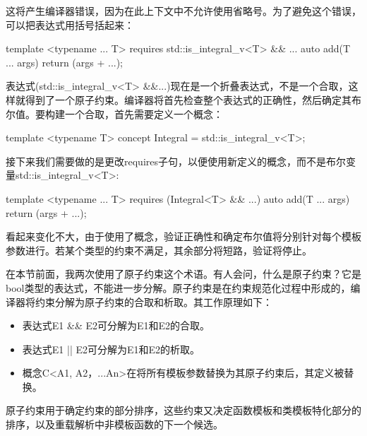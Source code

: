 这将产生编译器错误，因为在此上下文中不允许使用省略号。为了避免这个错误，可以把表达式用括号括起来：

\begin{cpp}
	template <typename ... T>
	requires std::is_integral_v<T> && ...
	auto add(T ... args)
	{
		return (args + ...);
	}
\end{cpp}

表达式(std::is\_integral\_v<T> \&\&...)现在是一个折叠表达式，不是一个合取，这样就得到了一个原子约束。编译器将首先检查整个表达式的正确性，然后确定其布尔值。要构建一个合取，首先需要定义一个概念：

\begin{cpp}
template <typename T>
concept Integral = std::is_integral_v<T>;
\end{cpp}

接下来我们需要做的是更改requires子句，以便使用新定义的概念，而不是布尔变量std::is\_integral\_v<T>:

\begin{cpp}
template <typename ... T>
requires (Integral<T> && ...)
auto add(T ... args)
{
	return (args + ...);
}
\end{cpp}

看起来变化不大，由于使用了概念，验证正确性和确定布尔值将分别针对每个模板参数进行。若某个类型的约束不满足，其余部分将短路，验证将停止。

在本节前面，我两次使用了原子约束这个术语。有人会问，什么是原子约束？它是bool类型的表达式，不能进一步分解。原子约束是在约束规范化过程中形成的，编译器将约束分解为原子约束的合取和析取。其工作原理如下：

\begin{itemize}
  \item 表达式E1 \&\& E2可分解为E1和E2的合取。
  \item 表达式E1 || E2可分解为E1和E2的析取。
  \item 概念C<A1, A2，...An>在将所有模板参数替换为其原子约束后，其定义被替换。
\end{itemize}

原子约束用于确定约束的部分排序，这些约束又决定函数模板和类模板特化部分的排序，以及重载解析中非模板函数的下一个候选。











